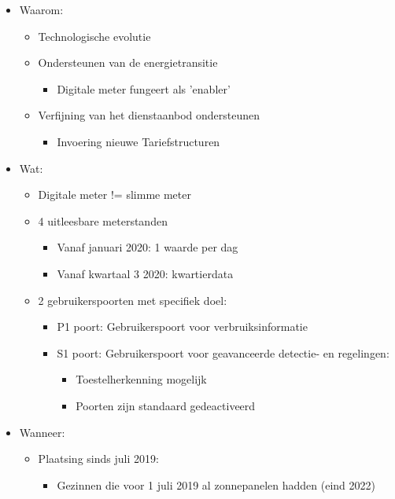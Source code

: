 \documentclass[12pt]{article}
\begin{document}
\begin{itemize}
    \item Waarom:\begin{itemize}
        \item Technologische evolutie 
        \item Ondersteunen van de energietransitie\begin{itemize}
            \item Digitale meter fungeert als 'enabler'
        \end{itemize}
        \item Verfijning van het dienstaanbod ondersteunen\begin{itemize}
            \item Invoering nieuwe Tariefstructuren
        \end{itemize}
    \end{itemize}
    \item Wat:\begin{itemize}
        \item Digitale meter != slimme meter 
        \item 4 uitleesbare meterstanden\begin{itemize}
            \item Vanaf januari 2020: 1 waarde per dag 
            \item Vanaf kwartaal 3 2020: kwartierdata
        \end{itemize}
        \item 2 gebruikerspoorten met specifiek doel:\begin{itemize}
            \item P1 poort: Gebruikerspoort voor verbruiksinformatie
            \item S1 poort: Gebruikerspoort voor geavanceerde detectie- en regelingen:\begin{itemize}
                \item Toestelherkenning mogelijk 
                \item Poorten zijn standaard gedeactiveerd
            \end{itemize}
        \end{itemize}
    \end{itemize}
    \item Wanneer:\begin{itemize}
        \item Plaatsing sinds juli 2019:\begin{itemize}
            \item Gezinnen die voor 1 juli 2019 al zonnepanelen hadden (eind 2022)

\end{itemize}
\end{itemize}
\end{itemize}
\end{document}

